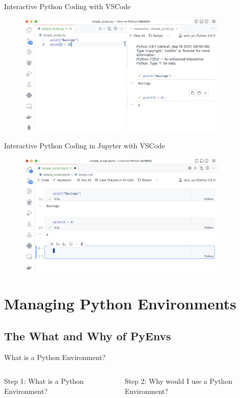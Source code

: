 \documentclass[aspectratio=1610]{beamer}
\begin{document}
\begin{frame}{Interactive Python Coding with VSCode}
		\begin{figure}
			\includegraphics[width=0.9\textwidth]{images/vscode}
		\end{figure}
\end{frame}

\begin{frame}{Interactive Python Coding in Jupyter with VSCode}
		\begin{figure}
			\includegraphics[width=0.9\textwidth]{images/jupyter_in_vscode}
		\end{figure}
\end{frame}

\section{Managing Python Environments}

\subsection{The What and Why of PyEnvs}

\begin{frame}[t]{What is a Python Environment?}
	\begin{columns}[t]
		\begin{column}{0.45\textwidth}
			Step 1: What is a Python Environment?
		\end{column}
		\begin{column}{0.45\textwidth}
			Step 2: Why would I use a Python Environment?
		\end{column}
	\end{columns}
\end{frame}
\end{document}
